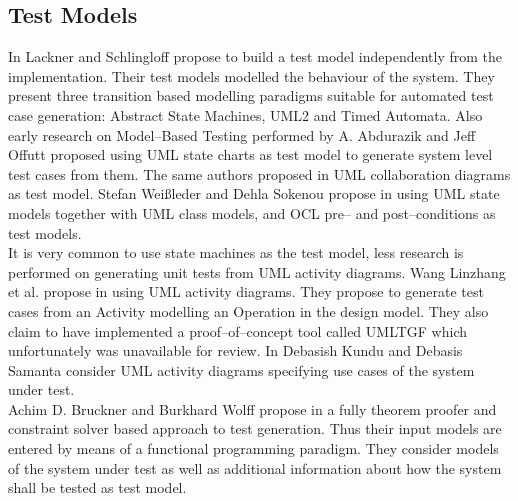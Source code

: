 \subsection{Test Models}
In \cite{lackner2012modeling} Lackner and Schlingloff propose to build a test model independently from the implementation. Their test models modelled the behaviour of the system. They present three transition based modelling paradigms suitable for automated test case generation: Abstract State Machines, UML2  and Timed Automata. Also early research on Model--Based Testing performed by A. Abdurazik and Jeff Offutt \cite{Offutt:1999:GeneratingTestsFromUmlSpec} proposed using UML state charts as test model to generate system level test cases from them. The same authors proposed in \cite{Abdurazik00usingumlCollaborationTestGeneration} UML collaboration diagrams as test model. Stefan Wei{\ss}leder and Dehla Sokenou propose in \cite{weissleder2008automatic} using UML state models together with UML class models, and OCL pre-- and post--conditions as test models.\\
It is very common to use state machines as the test model, less research is performed on generating unit tests from UML activity diagrams. Wang Linzhang et al. propose in \cite{Linzhang04GeneratingTestCasefromActivityGrayBoxMethod} using UML activity diagrams. They propose to generate test cases from an Activity modelling an Operation in the design model. They also claim to have implemented a proof--of--concept tool called UMLTGF which unfortunately was unavailable for review. %
In \cite{kundu2009novel} Debasish Kundu and Debasis Samanta consider UML activity diagrams specifying use cases of the system under test.%
\\
Achim D. Bruckner and Burkhard Wolff propose in \cite{brucker2012theoremProverBasedTesting} a fully theorem proofer and constraint solver based approach to test generation. Thus their input models are entered by means of a functional programming paradigm. They consider models of the system under test as well as additional information about how the system shall be tested as test model.\\
